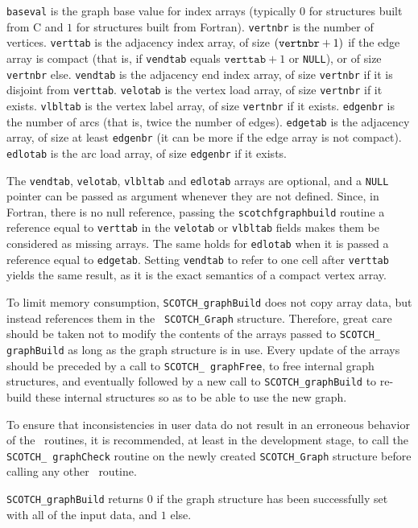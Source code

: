 \begin{itemize}
{\tt baseval} is the graph base value for index arrays (typically $0$ for
structures built from C and $1$ for structures built from Fortran).
{\tt vertnbr} is the number of vertices.
{\tt verttab} is the adjacency index array, of size $({\tt vertnbr} +
1)$ if the edge array is compact (that is, if {\tt vendtab} equals
$\mathtt{verttab}+1$ or {\tt NULL}), or of size {\tt vertnbr} else.
{\tt vendtab} is the adjacency end index array, of size {\tt vertnbr} if
it is disjoint from {\tt verttab}.
{\tt velotab} is the vertex load array, of size {\tt vertnbr} if it exists.
{\tt vlbltab} is the vertex label array, of size {\tt vertnbr} if it exists.
{\tt edgenbr} is the number of arcs (that is, twice the number of edges).
{\tt edgetab} is the adjacency array, of size at least {\tt edgenbr}
(it can be more if the edge array is not compact). {\tt edlotab} is
the arc load array, of size {\tt edgenbr} if it exists.

The {\tt vendtab}, {\tt velotab}, {\tt vlbltab} and {\tt edlotab}
arrays are optional, and a {\tt NULL} pointer can be passed as
argument whenever they are not defined.
Since, in Fortran, there is no null reference, passing the
{\tt scotchf\lbt graph\lbt build} routine a reference equal to
{\tt verttab} in the {\tt velotab} or {\tt vlbltab} fields makes them
be considered as missing arrays. The same holds for {\tt edlotab}
when it is passed a reference equal to {\tt edgetab}. Setting
{\tt vendtab} to refer to one cell after {\tt verttab} yields the
same result, as it is the exact semantics of a compact vertex array.

To limit memory consumption, {\tt SCOTCH\_\lbt graph\lbo Build} does
not copy array data, but instead references them in the {\tt
SCOTCH\_\lbt Graph} structure. Therefore, great care should be taken
not to modify the contents of the arrays passed to {\tt SCOTCH\_\lbt
graph\lbo Build} as long as the graph structure is in use. Every
update of the arrays should be preceded by a call to {\tt SCOTCH\_\lbt
graph\lbo Free}, to free internal graph structures, and eventually
followed by a new call to {\tt SCOTCH\_\lbt graph\lbo Build} to
re-build these internal structures so as to be able to use the new
graph.

To ensure that inconsistencies in user data do not result in an
erroneous behavior of the \libscotch\ routines, it is recommended, at
least in the development stage, to call the {\tt SCOTCH\_\lbt
graph\lbt Check} routine on the newly created {\tt SCOTCH\_\lbt Graph}
structure before calling any other \libscotch\ routine.

\progret

{\tt SCOTCH\_graphBuild} returns $0$ if the graph structure has been
successfully set with all of the input data, and $1$ else.
\end{itemize}

